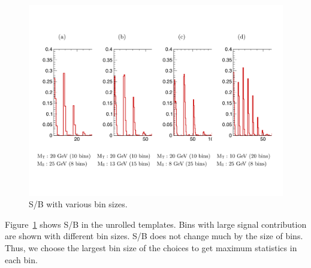 \begin{figure}[htp]
	\centering
	\includegraphics[width=1.0\textwidth]{figures/binsize.pdf}
	\caption{ S/B with various bin sizes.}
  	\label{fig:app_binsize}
\end{figure}

Figure~\ref{fig:app_binsize} shows S/B in the unrolled templates. 
Bins with large signal contribution are shown with different bin sizes. 
S/B does not change much by the size of bins.  
Thus, we choose the largest bin size of the choices to get maximum statistics in each bin.  
